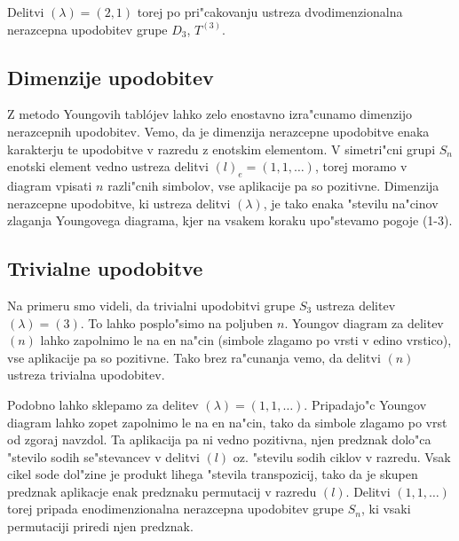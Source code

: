 \documentclass[a4paper,10pt]{article}
\begin{document}
  Delitvi $(\lambda) = (2,1)$ torej po pri"cakovanju ustreza dvodimenzionalna nerazcepna upodobitev grupe $D_3$, $T^{(3)}$. 

\subsection{Dimenzije upodobitev}

Z metodo Youngovih tabl\'ojev lahko zelo enostavno izra"cunamo dimenzijo nerazcepnih upodobitev. Vemo, da je dimenzija nerazcepne upodobitve enaka karakterju te upodobitve v razredu z enotskim elementom. V simetri"cni grupi $S_n$ enotski element vedno ustreza delitvi $(l)_e = (1,1,\ldots)$, torej moramo v diagram vpisati $n$ razli"cnih simbolov, vse aplikacije pa so pozitivne. Dimenzija nerazcepne upodobitve, ki ustreza delitvi $(\lambda)$, je tako enaka "stevilu na"cinov zlaganja Youngovega diagrama, kjer na vsakem koraku upo"stevamo pogoje (1-3). 

\subsection{Trivialne upodobitve}

Na primeru smo videli, da trivialni upodobitvi grupe $S_3$ ustreza delitev $(\lambda) = (3)$. To lahko posplo"simo na poljuben $n$. Youngov diagram za delitev $(n)$ lahko zapolnimo le na en na"cin (simbole zlagamo po vrsti v edino vrstico), vse aplikacije pa so pozitivne. Tako brez ra"cunanja vemo, da delitvi $(n)$ ustreza trivialna upodobitev. 

Podobno lahko sklepamo za delitev $(\lambda) = (1, 1, \ldots)$. Pripadajo"c Youngov diagram lahko zopet zapolnimo le na en na"cin, tako da simbole zlagamo po vrst od zgoraj navzdol. Ta aplikacija pa ni vedno pozitivna, njen predznak dolo"ca "stevilo sodih se"stevancev v delitvi $(l)$ oz. "stevilu sodih ciklov v razredu. Vsak cikel sode dol"zine je produkt lihega "stevila transpozicij, tako da je skupen predznak aplikacje enak predznaku permutacij v razredu $(l)$. Delitvi $(1, 1, \ldots)$ torej pripada enodimenzionalna nerazcepna upodobitev grupe $S_n$, ki vsaki permutaciji priredi njen predznak. 
 
\end{document}
